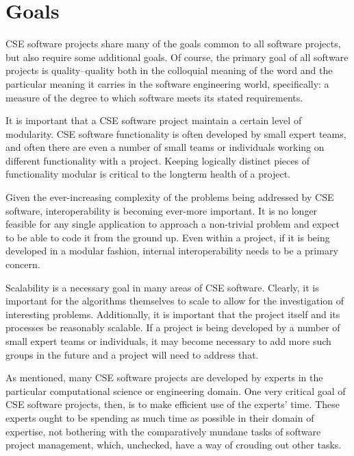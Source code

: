 \documentclass[12pt,relax]{article}
\begin{document}
\clearpage


\section{Goals}
\label{Section:Goals}

CSE software projects share many of the goals common to all software projects, 
but also require some additional goals.  Of course, the primary goal of all 
software projects is quality--quality both in the colloquial meaning of the 
word and the particular meaning it carries in the software engineering world, 
specifically:  a measure of the degree to which software meets its stated
requirements.

It is important that a CSE software project maintain a certain level of 
modularity.  CSE software functionality is often developed by small expert 
teams, and often there are even a number of small teams or individuals working 
on different functionality with a project.  Keeping logically distinct pieces 
of functionality modular is critical to the longterm health of a project.  

Given the ever-increasing complexity of the problems being addressed by CSE 
software, interoperability is becoming ever-more important.  It is no longer 
feasible for any single application to approach a non-trivial problem and
expect to be able to code it from the ground up.  Even within a project, if it 
is being developed in a modular fashion, internal interoperability needs to be 
a primary concern.

Scalability is a necessary goal in many areas of CSE software.  Clearly, it is 
important for the algorithms themselves to scale to allow for the investigation 
of interesting problems.  Additionally, it is important that the project itself 
and its processes be reasonably scalable.  If a project is being developed by a
number of small expert teams or individuals, it may become necessary to add 
more such groups in the future and a project will need to address that.

As mentioned, many CSE software projects are developed by experts in the 
particular computational science or engineering domain.  One very critical 
goal of CSE software projects, then, is to make efficient use of the experts' 
time.  These experts ought to be spending as much time as possible in their 
domain of expertise, not bothering with the comparatively mundane tasks of 
software project management, which, unchecked, have a way of crouding out 
other tasks.  
\end{document}
